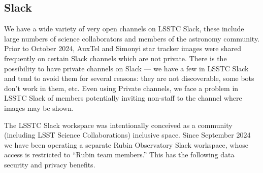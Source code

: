 \subsection{Slack} \label{sec:slack}

We have a wide variety of very open channels on LSSTC Slack, these include large numbers of science collaborators and members of the astronomy community.
Prior to October 2024, AuxTel and Simonyi star tracker images were shared frequently on certain Slack channels which are not private.
There is the possibility to have private channels on Slack --- we have a few in LSSTC Slack and tend to avoid them for several reasons: they are not discoverable, some bots don't work in them, etc.
Even using Private channels, we face a problem in LSSTC Slack of members potentially inviting non-staff to the channel where images may be shown.

The LSSTC Slack workspace was intentionally conceived as a community (including LSST Science Collaborations) inclusive space.
Since September 2024 we have been operating a separate Rubin Observatory Slack workspace, whose access is restricted to ``Rubin team members.''
This has the following data security and privacy benefits.


